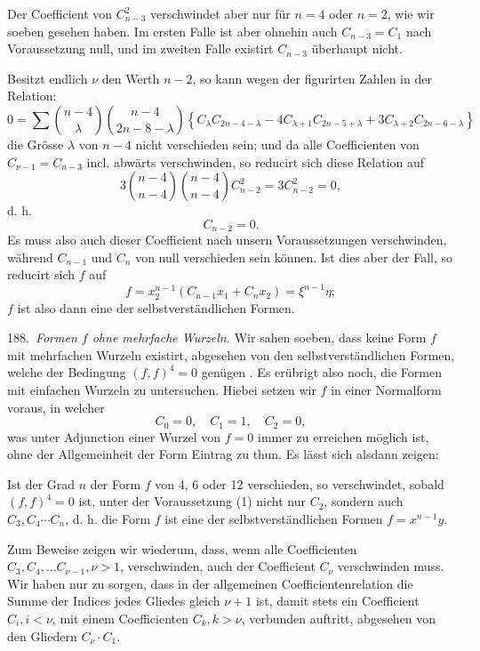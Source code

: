 \documentclass[11pt]{article}
\providecommand{\weberpage}[1]{}
\providecommand{\weq}[2]{\begin{equation}\tag{#1}#2\end{equation}}
\begin{document}
\weberpage{209}
Der Coefficient von $C^2_{n-3}$ verschwindet aber nur für $n=4$ oder
$n=2$, wie wir soeben gesehen haben. Im ersten Falle ist aber
ohnehin auch $C_{n-3}=C_1$ nach Voraussetzung null, und im zweiten
Falle existirt $C_{n-3}$ überhaupt nicht.

Besitzt endlich $\nu$ den Werth $n-2$, so kann wegen der figurirten
Zahlen in der Relation:
\[
0=\sum\binom{n-4}{\lambda}\binom{n-4}{2n-8-\lambda}\left\{C_\lambda C_{2n-4-\lambda}-4C_{\lambda+1}C_{2n-5+\lambda}+3C_{\lambda+2}C_{2n-6-\lambda}\right\}
\]
die Grösse $\lambda$ von $n-4$ nicht verschieden sein; und da alle Coefficienten
von $C_{\nu-1}=C_{n-3}$ incl. abwärts verschwinden, so reducirt sich diese
Relation auf
\[
3\binom{n-4}{n-4}\binom{n-4}{n-4}C_{n-2}^2=3C_{n-2}^2=0,
\]
d. h.
\[
C_{n-2}=0.
\]
Es muss also auch dieser Coefficient nach unsern Voraussetzungen
verschwinden, während $C_{n-1}$ und $C_n$ von null verschieden sein
können. Ist dies aber der Fall, so reducirt sich $f$ auf
\[
f=x_2^{n-1}(C_{n-1}x_1+C_nx_2)=\xi^{n-1}\eta;
\]
$f$ ist also dann eine der selbstverständlichen Formen.

188.\ \textit{Formen $f$ ohne mehrfache Wurzeln.} Wir sahen soeben, dass
keine Form $f$ mit mehrfachen Wurzeln existirt, abgesehen von den
selbstverständlichen Formen, welche der Bedingung $(f,f)^4=0$ genügen
. Es erübrigt also noch, die Formen mit einfachen Wurzeln zu
untersuchen. Hiebei setzen wir $f$ in einer Normalform voraus, in
welcher
\weq{1}{C_0=0,\quad C_1=1,\quad C_2=0,}
was unter Adjunction einer Wurzel von $f=0$ immer zu erreichen
möglich ist, ohne der Allgemeinheit der Form Eintrag zu thun. Es
lässt sich alsdann zeigen:

\glqq Ist der Grad $n$ der Form $f$ von 4, 6 oder 12 verschieden,
so verschwindet, sobald $(f,f)^4=0$ ist, unter der Voraussetzung
 (1) nicht nur $C_2$, sondern auch $C_3, C_4\cdots C_n$, d. h. die
Form $f$ ist eine der selbstverständlichen Formen $f=x^{n-1}y$.\grqq{}

Zum Beweise zeigen wir wiederum, dass, wenn alle Coefficienten
$C_3, C_4, \ldots C_{\nu-1}, \nu>1$, verschwinden, auch der Coefficient $C_\nu$ verschwinden
 muss. Wir haben nur zu sorgen, dass in der allgemeinen
Coefficientenrelation die Summe der Indices jedes Gliedes gleich
$\nu+1$ ist, damit stets ein Coefficient $C_i, i<\nu$, mit einem Coefficienten
$C_k, k>\nu$, verbunden auftritt, abgesehen von den Gliedern $C_\nu\cdot C_1$.
\end{document}
